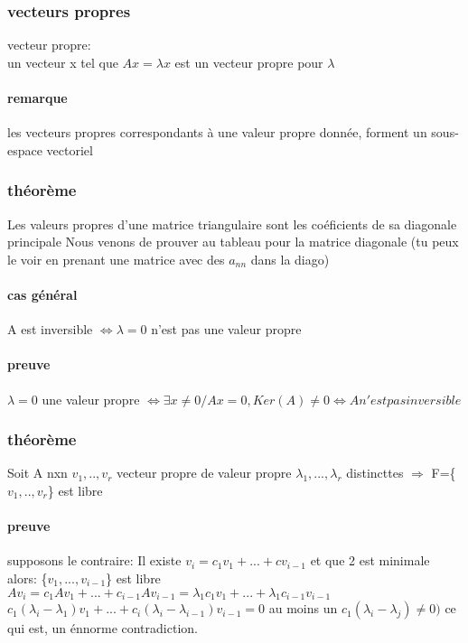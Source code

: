 \documentclass[a4paper,10pt]{article}
\begin{document}
\subsubsection{vecteurs propres}
\begin{description}
 \item vecteur propre:\\{un vecteur x tel que $Ax=\lambda x$ est un vecteur propre pour $\lambda$}
\end{description}
\paragraph{remarque}
les vecteurs propres correspondants à une valeur propre donnée, forment un sous-espace vectoriel
\subsubsection{théorème}
Les valeurs propres d'une matrice triangulaire sont les coéficients de sa diagonale principale
\newline
Nous venons de prouver au tableau pour la matrice diagonale (tu peux le voir en prenant une matrice avec des $a_{nn}$ dans la diago)
\paragraph{cas général}
A est inversible $\Leftrightarrow \lambda = 0$ n'est pas une valeur propre
\paragraph{preuve}
$\lambda=0$ une valeur propre $\Leftrightarrow\exists x\neq0/Ax=0,Ker(A)\neq 0\Leftrightarrow A n'est pas inversible$
\subsubsection{théorème}
Soit A nxn
\newline
$v_1,..,v_r$ vecteur propre de valeur propre $\lambda_1,...,\lambda_r$ distincttes $\Rightarrow$ F=\{$v_1,..,v_r$\} est libre
\paragraph{preuve}
supposons le contraire:
\newline
Il existe $v_i=c_1v_1+...+cv_{i-1}$ et que 2 est minimale
\newline
alors: \{$v_1,...,v_{i-1}$\} est libre
\newline
$Av_i=c_1Av_1+...+c_{i-1}Av_{i-1}= \lambda_1c_1v_1+...+\lambda_1c_{i-1}v_ {i-1}$
\newline
$c_1(\lambda_i-\lambda_1)v_1+...+c_i(\lambda_i-\lambda_{i-1})v_{i-1}=0$
\newline
au moins un $c_1(\lambda_i-\lambda_j)\neq 0)$ ce qui est, un énnorme contradiction.
\end{document}
